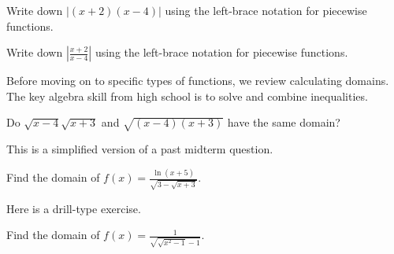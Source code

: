 \documentclass[../main.tex]{subfiles}
\begin{document}

\begin{example} \label{eg:piecewise-abs-of-function}
  Write down \(|(x + 2)(x - 4)|\) using the left-brace notation for piecewise functions.

  \blanks*
\end{example}

\begin{exercise}
  Write down \(\left| \frac{x + 2}{x - 4} \right|\) using the left-brace notation for piecewise functions.

  \blanks*
\end{exercise}
\clearpage

Before moving on to specific types of functions, we review calculating domains. The key algebra skill from high school is to solve and combine inequalities.

\begin{example}
  Do \(\sqrt{x - 4}\sqrt{x + 3}\) and \(\sqrt{(x - 4)(x + 3)}\) have the same domain?

  {\footnotesize This is a simplified version of a past midterm question.}

  \blanks*
\end{example}
\clearpage

\begin{example}
  Find the domain of \(f(x) = \frac{\ln(x + 5)}{\sqrt{ 3 - \sqrt{x + 3} }}\).

\end{example}

Here is a drill-type exercise.
\begin{exercise}
  Find the domain of \(f(x) = \frac{1}{\sqrt{ \sqrt{x^{2} - 1} - 1}}\).

  \blanks*
\end{exercise}
\clearpage
\end{document}
